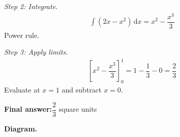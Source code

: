 \documentclass[11pt]{article}
\begin{document}
\textit{Step 2: Integrate.}
\[\begin{gathered}
\int (2x - x^2)\, \mathrm{d}x = x^2 - \dfrac{x^3}{3}
\end{gathered}\]
Power rule.

\textit{Step 3: Apply limits.}
\[\begin{gathered}
\left[x^2 - \dfrac{x^3}{3}\right]_0^1 = 1 - \dfrac{1}{3} - 0 = \dfrac{2}{3}
\end{gathered}\]
Evaluate at \( x = 1 \) and subtract \( x = 0 \).

\begin{answerbox}
\textbf{Final answer:}\quad \(\displaystyle \dfrac{2}{3}\) square units
\end{answerbox}
\textbf{Diagram.}

\begin{center}
\end{center}
\end{document}
